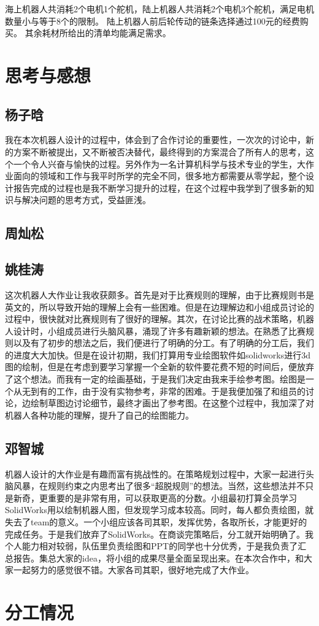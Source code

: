 \documentclass{Robot}
\begin{document}
    海上机器人共消耗2个电机1个舵机，陆上机器人共消耗2个电机3个舵机，满足电机数量小与等于8个的限制。
    陆上机器人前后轮传动的链条选择通过100元的经费购买。
    其余耗材所给出的清单均能满足需求。

    \section{思考与感想}

        \subsection{杨子晗}
        我在本次机器人设计的过程中，体会到了合作讨论的重要性，一次次的讨论中，新的方案不断被提出，又不断被否决替代，最终得到的方案混合了所有人的思考，这个一个令人兴奋与愉快的过程。另外作为一名计算机科学与技术专业的学生，大作业面向的领域和工作与我平时所学的完全不同，很多地方都需要从零学起，整个设计报告完成的过程也是我不断学习提升的过程，在这个过程中我学到了很多新的知识与解决问题的思考方式，受益匪浅。
        \subsection{周灿松}
        \subsection{姚桂涛}
        这次机器人大作业让我收获颇多。首先是对于比赛规则的理解，由于比赛规则书是英文的，所以导致开始的理解上会有一些困难。但是在边理解边和小组成员讨论的过程中，很快就对比赛规则有了很好的理解。其次，在讨论比赛的战术策略，机器人设计时，小组成员进行头脑风暴，涌现了许多有趣新颖的想法。在熟悉了比赛规则以及有了初步的想法之后，我们便进行了明确的分工。有了明确的分工后，我们的进度大大加快。但是在设计初期，我们打算用专业绘图软件如solidworks进行3d图的绘制，但是在考虑到要学习掌握一个全新的软件要花费不短的时间后，便放弃了这个想法。而我有一定的绘画基础，于是我们决定由我来手绘参考图。绘图是一个从无到有的工作，由于没有实物参考，非常的困难。于是我便加强了和组员的讨论，边绘制草图边讨论细节，最终才画出了参考图。在这整个过程中，我加深了对机器人各种功能的理解，提升了自己的绘图能力。
        \subsection{邓智城}
        机器人设计的大作业是有趣而富有挑战性的。在策略规划过程中，大家一起进行头脑风暴，在规则约束之内思考出了很多“超脱规则”的想法。当然，这些想法并不只是新奇，更重要的是非常有用，可以获取更高的分数。小组最初打算全员学习SolidWorks用以绘制机器人图，但发现学习成本较高。同时，每人都负责绘图，就失去了team的意义。一个小组应该各司其职，发挥优势，各取所长，才能更好的完成任务。于是我们放弃了SolidWorks。在商谈完策略后，分工就开始明确了。我个人能力相对较弱，队伍里负责绘图和PPT的同学也十分优秀，于是我负责了汇总报告。集总大家的idea，将小组的成果尽量全面呈现出来。在本次合作中，和大家一起努力的感觉很不错。大家各司其职，很好地完成了大作业。
    
    \section{分工情况}
\end{document}
